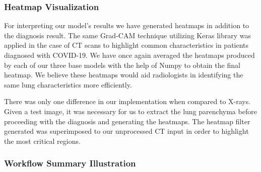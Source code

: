 \subsubsection{Heatmap Visualization}

For interpreting our model's results we have generated heatmaps in addition to the diagnosis result. The same Grad-CAM technique utilizing Keras library \cite{KCV} was applied in the case of CT scans to highlight common characteristics in patients diagnosed with COVID-19. We have once again averaged the heatmaps produced by each of our three base models with the help of Numpy \cite{NUM} to obtain the final heatmap. We believe these heatmaps would aid radiologists in identifying the same lung characteristics more efficiently.

There was only one difference in our implementation when compared to X-rays. Given a test image, it was necessary for us to extract the lung parenchyma before proceeding with the diagnosis and generating the heatmaps. The heatmap filter generated was superimposed to our unprocessed CT input in order to highlight the most critical regions.

\subsubsection{Workflow Summary Illustration}

